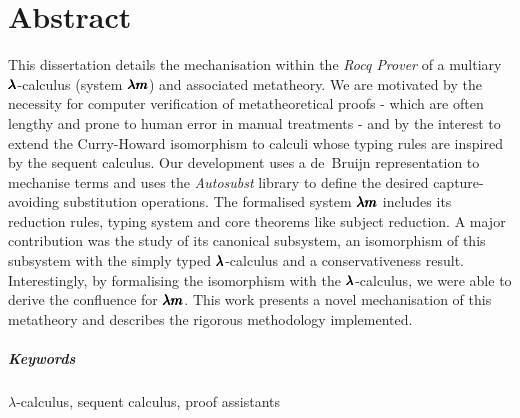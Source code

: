 \chapter*{Abstract}
\thispagestyle{title_on_header}

This dissertation details the mechanisation within the \textit{Rocq Prover} of a multiary $\pmb{\lambda}$-calculus (system $\pmb{\lambda m}$) and associated metatheory.
We are motivated by the necessity for computer verification of metatheoretical proofs - which are often lengthy and prone to human error in manual treatments - and by the interest to extend the Curry-Howard isomorphism to calculi whose typing rules are inspired by the sequent calculus.
Our development uses a de~Bruijn representation to mechanise terms and uses the \textit{Autosubst} library to define the desired capture-avoiding substitution operations.
The formalised system $\pmb{\lambda m}$ includes its reduction rules, typing system and core theorems like subject reduction.
A major contribution was the study of its canonical subsystem, an isomorphism of this subsystem with the simply typed $\pmb{\lambda}$-calculus and a conservativeness result.
Interestingly, by formalising the isomorphism with the $\pmb{\lambda}$-calculus, we were able to derive the confluence for $\pmb{\lambda m}$.
This work presents a novel mechanisation of this metatheory and describes the rigorous methodology implemented.

\paragraph{Keywords} $\lambda$-calculus, sequent calculus, proof assistants


